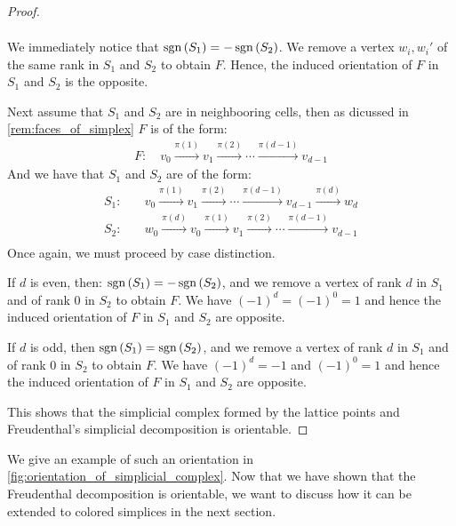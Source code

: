 \begin{proof}
\begin{case}{1}
\begin{align*}
		\end{align*}
		We immediately notice that $\operatorname{sgn}\left(S_1\right) = - \operatorname{sgn}\left(S_2\right)$. We remove a vertex $w_i, w_i'$ of the same rank in $S_1$ and $S_2$ to obtain $F$. Hence, the induced orientation of $F$ in $S_1$ and $S_2$ is the opposite.
	\end{case}
	\begin{case}{2}
		Next assume that $S_1$ and $S_2$ are in neighbooring cells, then as dicussed in \cref{rem:faces_of_simplex} $F$ is of the form:
		\begin{align*}
			F: \quad v_0 \xrightarrow{\pi(1)} v_1 \xrightarrow{\pi(2)} \cdots \xrightarrow{\pi(d-1)} v_{d-1}
		\end{align*}
		And we have that $S_1$ and $S_2$ are of the form:
		\begin{align*}
			S_1: & \quad v_0 \xrightarrow{\pi(1)} v_1 \xrightarrow{\pi(2)} \cdots \xrightarrow{\pi(d-1)} v_{d-1} \xrightarrow{\pi(d)} w_d \\
			S_2: & \quad w_0 \xrightarrow{\pi(d)} v_0 \xrightarrow{\pi(1)} v_1 \xrightarrow{\pi(2)} \cdots \xrightarrow{\pi(d-1)} v_{d-1} \\
		\end{align*}
		Once again, we must proceed by case distinction.
		\begin{case}{2.1}
			If $d$ is even, then: $\operatorname{sgn}\left(S_1\right) = - \operatorname{sgn}\left(S_2\right)$, and we remove a vertex of rank $d$ in $S_1$ and of rank $0$ in $S_2$ to obtain $F$. We have $(-1)^d = (-1)^0 = 1$ and hence the induced orientation of $F$ in $S_1$ and $S_2$ are opposite.
		\end{case}
		\begin{case}{2.2}
			If $d$ is odd, then $\operatorname{sgn}\left(S_1\right) = \operatorname{sgn}\left(S_2\right)$, and we remove a vertex of rank $d$ in $S_1$ and of rank $0$ in $S_2$ to obtain $F$. We have $(-1)^d = -1$ and $(-1)^0 = 1$ and hence the induced orientation of $F$ in $S_1$ and $S_2$ are opposite.
		\end{case}
	\end{case}
	This shows that the simplicial complex formed by the lattice points and Freudenthal's simplicial decomposition is orientable.
\end{proof}

We give an example of such an orientation in \cref{fig:orientation_of_simplicial_complex}. Now that we have shown that the Freudenthal decomposition is orientable, we want to discuss how it can be extended to colored simplices in the next section.

